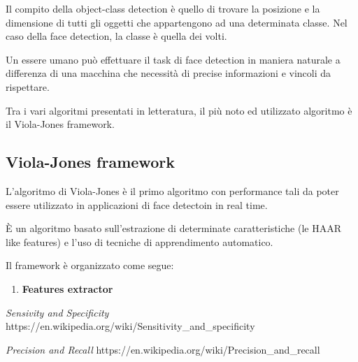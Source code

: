 Il compito della object-class detection è quello di trovare la posizione e la dimensione di tutti gli oggetti che appartengono ad una determinata classe. Nel caso della face detection, la classe è quella dei volti.

Un essere umano può effettuare il task di face detection in maniera naturale a differenza di una macchina che necessità di precise informazioni e vincoli da rispettare.

Tra i vari algoritmi presentati in letteratura, il più noto ed utilizzato algoritmo è il Viola-Jones framework.

\subsection{Viola-Jones framework}
L'algoritmo di Viola-Jones è il primo algoritmo con performance tali da poter essere utilizzato in applicazioni di face detectoin in real time.

È un algoritmo basato sull'estrazione di determinate caratteristiche (le HAAR like features) e l'uso di tecniche di apprendimento automatico.

Il framework è organizzato come segue:
\begin{enumerate}
 \item \textbf{Features extractor }
\end{enumerate}




\clearpage

\clearpage
\begin{thebibliography}{9}
        \emph{Sensivity and Specificity}
        https://en.wikipedia.org/wiki/Sensitivity\_and\_specificity

        \emph{Precision and Recall}
        https://en.wikipedia.org/wiki/Precision\_and\_recall

\end{thebibliography}


